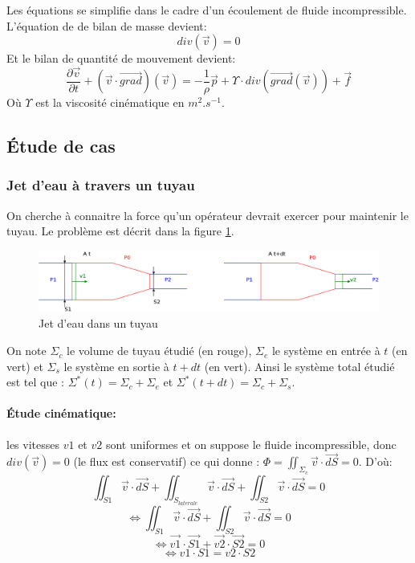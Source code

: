 \documentclass[10pt,a4paper]{article}
\begin{document}
Les équations se simplifie dans le cadre d'un écoulement de fluide incompressible. L'équation de de bilan de masse devient:
\begin{equation}
div(\vec{v}) = 0
\end{equation}
Et le bilan de quantité de mouvement devient:
\begin{equation}
\frac{\partial \vec{v}}{\partial t} + (\vec{v}\cdot\vec{grad})(\vec{v}) = -\frac{1}{\rho}\vec{p} + \Upsilon\cdot div(\vec{grad}(\vec{v})) + \vec{f}
\end{equation}
Où $\Upsilon$ est la viscosité cinématique en $m^{2}.s^{-1}$.



\subsection{Étude de cas}

\subsubsection{Jet d'eau à travers un tuyau}
On cherche à connaitre la force qu'un opérateur devrait exercer pour maintenir le tuyau. Le problème est décrit dans la figure \ref{fig:tuyau}.
\begin{figure}
\centering
\includegraphics[scale=0.20]{tuyau}
\caption{Jet d'eau dans un tuyau}
\label{fig:tuyau}
\end{figure}
On note $\Sigma_{c}$ le volume de tuyau étudié (en rouge), $\Sigma_{e}$ le système en entrée à $t$ (en vert) et $\Sigma_{s}$ le système en sortie à $t+dt$ (en vert). Ainsi le système total étudié est tel que : $\Sigma^{*}(t) = \Sigma_{c} + \Sigma_{e}$ et $\Sigma^{*}(t+dt) = \Sigma_{c} + \Sigma_{s}$.

\paragraph{Étude cinématique:} les vitesses $v1$ et $v2$ sont uniformes et on suppose le fluide incompressible, donc $div(\vec{v}) = 0$ (le flux est conservatif) ce qui donne : $\Phi = \iint_{\Sigma_{c}}\vec{v}\cdot\vec{dS} = 0$. D'où:
\[       \iint_{S1}\vec{v}\cdot\vec{dS} + \iint_{S_{laterale}}\vec{v}\cdot\vec{dS} + \iint_{S2}\vec{v}\cdot\vec{dS} = 0\]
\[ \iff  \iint_{S1}\vec{v}\cdot\vec{dS} + \iint_{S2}\vec{v}\cdot\vec{dS} = 0\]
\[ \iff  \vec{v1}\cdot\vec{S1} + \vec{v2}\cdot\vec{S2} = 0 \]
\[ \iff  v1\cdot S1 = v2\cdot S2 \]
\end{document}
